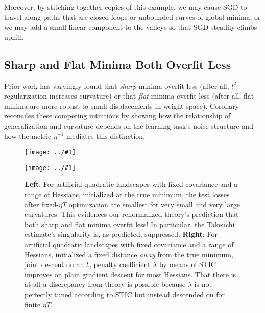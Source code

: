 \documentclass{article}
\newcommand{\plotmoo}[3]{
    \texttt{[image: ../\#1]}
}
\begin{document}
        Moreover, by stitching together copies of this example, we may cause
        SGD to travel along paths that are closed loops or unbounded curves of
        global minima, or we may add a small linear component to the valleys so
        that SGD steadily climbs uphill.  



    \subsection{Sharp and Flat Minima Both Overfit Less} \label{subsect:overfit}
        Prior work has varyingly found that \emph{sharp} minima overfit less
        (after all, $l^2$ regularization increases curvature) or that
        \emph{flat} minima overfit less (after all, flat minima are more
        robust to small displacements in weight space).  Corollary
        \label{cor:overfit} reconciles these competing intuitions by showing
        how the relationship of generalization and curvature depends on the
        learning task's noise structure and how the metric $\eta^{-1}$ mediates
        this distinction.
        
        \begin{figure}[h!] 
            \centering
            \plotmoo{plots/tak}{0.48\columnwidth}{4.0cm}
            \plotmoo{plots/tak-reg}{0.48\columnwidth}{4.0cm}
            \caption{
                {\bf Left}: For artificial quadratic landscapes with fixed
                covariance and a range of Hessians, initialized at the true
                minimum, the test losses after fixed-$\eta T$ optimization are
                smallest for very small and very large curvatures.  This
                evidences our renormalized theory's prediction that both sharp
                and flat minima overfit less!  In particular, the Takeuchi
                estimate's singularity is, as predicted, suppressed.
                {\bf Right}: For artificial quadratic landscapes with fixed
                covariance and a range of Hessians, initialized a fixed
                distance \emph{away} from the true minimum, joint descent on 
                an $l_2$ penalty coefficient $\lambda$ by means of STIC
                improves on plain gradient descent for most Hessians.  That
                there is at all a discrepancy from theory is possible because
                $\lambda$ is not perfectly tuned according to STIC but instead
                descended on for finite $\eta T$.
            }
            \label{fig:tak}
        \end{figure}
\end{document}
